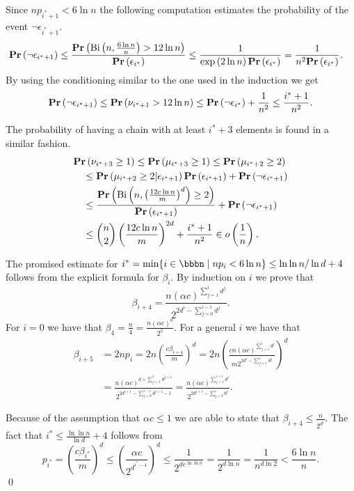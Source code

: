 Since $np_{i^* + 1} < 6 \ln n$ the following computation estimates the probability of the event $\neg \epsilon_{i^* + 1}$. 
\[
\begin{split}
\mathbf{Pr}\left(\neg \epsilon_{i^* + 1}\right)
	\leq \frac{\mathbf{Pr}\left(\mathrm{Bi}\left(n, \frac{6 \ln n}{n}\right) > 12 \ln n\right)}{\mathbf{Pr}\left(\epsilon_{i^*}\right)} 
	& \leq \frac{1}{\exp\left(2 \ln n\right)\mathbf{Pr}\left(\epsilon_{i^*}\right)} = \frac{1}{n ^ 2 \mathbf{Pr}\left(\epsilon_{i^*}\right)} \textit{.}
\end{split}
\]
By using the conditioning similar to the one used in the induction we get
\[
\mathbf{Pr}\left(\neg \epsilon_{i^* + 1}\right) \leq \mathbf{Pr}\left(\nu_{i^* + 1} > 12 \ln n\right) \leq \mathbf{Pr}\left(\neg \epsilon_{i^*}\right) + \frac{1}{n ^ 2} \leq \frac{i^* + 1}{n ^ 2} \textit{.}
\]

The probability of having a chain with at least $i^* + 3$ elements is found in a similar fashion.
\[
\begin{split}
& \mathbf{Pr}\left(\nu_{i^* + 3} \geq 1\right)
	\leq \mathbf{Pr}\left(\mu_{i^* + 3} \geq 1\right) \leq \mathbf{Pr}\left(\mu_{i^* + 2} \geq 2\right) \\
	& \quad \leq \mathbf{Pr}\left(\mu_{i^* + 2} \geq 2 | \epsilon_{i^* + 1}\right)\mathbf{Pr}\left(\epsilon_{i^* + 1}\right) + \mathbf{Pr}\left(\neg \epsilon_{i^* + 1}\right) \\
	& \quad \leq \frac{\mathbf{Pr}\left(\mathrm{Bi}\left(n, \left(\frac{12 c \ln n}{m}\right) ^ d\right) \geq 2\right)}{\mathbf{Pr}\left(\epsilon_{i^* + 1}\right)} + \mathbf{Pr}\left(\neg \epsilon_{i^* + 1}\right) \\
	& \quad \leq \binom{n}{2} \left(\frac{12 c \ln n}{m}\right) ^ {2d} + \frac{i^* + 1}{n ^ 2} \in o\left(\frac{1}{n}\right) \textit{.}
\end{split}
\]

The promised estimate for $i^* = \displaystyle\min \{i \in \bbbn \setdelim np_i < 6 \ln n\} \leq \ln \ln n / \ln d + 4$ follows from the explicit formula for $\beta_i$. By induction on $i$ we prove that $$\beta_{i + 4} = \frac{n \left(\alpha c\right) ^ {\sum_{j = 1}^{i}d ^ j}}{2 ^ {2 d ^ i - \sum_{j = 0}^{i - 1}{d ^ j}}} \textit{.}$$ For $i = 0$ we have that $\beta_4 = \frac{n}{4} = \frac{n\left(\alpha c\right) ^ 0}{2 ^ {2}}$. For a general $i$ we have that
\[
\begin{split}
\beta_{i + 5} 
	& = 2np_i = 2n \left(\frac{c\beta_{i + 4}}{m}\right) ^ d = 2n \left(\frac{cn\left(\alpha c\right) ^ {\sum_{j = 1}^{i}d ^ j}}{m 2 ^ {2 d ^ i - \sum_{j = 1}^{i}d^j}}\right) ^ d \\
	& = \frac{n\left(\alpha c\right) ^ {d + \sum_{j = 1}^{i} d ^ {j + 1}}}{2 ^ {2d ^ {i + 1} - \sum_{j = 0}^{i  -1} d ^ {j + 1} - 1}} = \frac{n \left(\alpha c\right) ^ {\sum_{j = 1}^{i + 1} d ^ j}}{2 ^ {2d ^ {i + 1} - \sum_{j = 0}^{i} d ^ j}} \textit{.}
\end{split}
\]

Because of the assumption that $\alpha c \leq 1$ we are able to state that $\beta_{i + 4} \leq \frac{n}{2 ^ {d ^ i}}$. The fact that $i^* \leq \frac{\ln \ln n}{\ln d} + 4$ follows from
\[
p_{i^*} = \left(\frac{c\beta_{i^*}}{m}\right) ^ d \leq \left(\frac{\alpha c}{2 ^ {d ^ {i^* - 4}}}\right) ^ d \leq \frac{1}{2 ^ {de^{\ln \ln n}}} = \frac{1}{2 ^ {d \ln n}} = \frac{1}{n ^ {d \ln 2}} < \frac{6 \ln n}{n}.
\]
\qed
